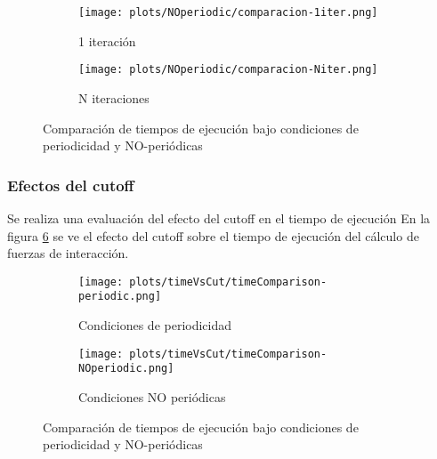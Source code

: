\begin{figure}[htbp]
\centering
\begin{subfigure}[b]{\plotwidthtres}
   \texttt{[image: plots/NOperiodic/comparacion-1iter.png]}
   \caption{1 iteración}
   \label{compar-1iter}
 \end{subfigure}
\begin{subfigure}[b]{\plotwidthtres}
   \texttt{[image: plots/NOperiodic/comparacion-Niter.png]}
   \caption{N iteraciones}
   \label{compar-niter}
 \end{subfigure}
 \caption{Comparaci\'on de tiempos de ejecuci\'on bajo condiciones de periodicidad y NO-periódicas}
 \label{periodic-effects}
\end{figure}


\subsubsection{Efectos del cutoff}
Se realiza una evaluación del efecto del cutoff en el tiempo de ejecución
En la figura \ref{time-vs-cut} se ve el efecto del cutoff sobre el tiempo de ejecución del cálculo de fuerzas de interacción.



\begin{figure}[htbp]
\centering
\begin{subfigure}[b]{\plotwidthtres}
   \texttt{[image: plots/timeVsCut/timeComparison-periodic.png]}
   \caption{Condiciones de periodicidad}
   \label{compar-1iter}
 \end{subfigure}
\begin{subfigure}[b]{\plotwidthtres}
   \texttt{[image: plots/timeVsCut/timeComparison-NOperiodic.png]}
   \caption{Condiciones NO periódicas}
   \label{compar-niter}
 \end{subfigure}
 \caption{Comparaci\'on de tiempos de ejecuci\'on bajo condiciones de periodicidad y NO-periódicas}
 \label{time-vs-cut}
\end{figure}


